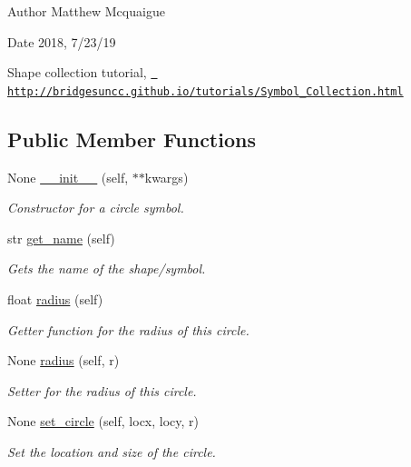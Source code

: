 \begin{DoxyAuthor}{Author}
Matthew Mcquaigue 
\end{DoxyAuthor}
\begin{DoxyDate}{Date}
2018, 7/23/19
\end{DoxyDate}
Shape collection tutorial, \href{http://bridgesuncc.github.io/tutorials/Symbol_Collection.html}{\texttt{ http\+://bridgesuncc.\+github.\+io/tutorials/\+Symbol\+\_\+\+Collection.\+html}} \subsection*{Public Member Functions}
\begin{DoxyCompactItemize}
\item 
None \mbox{\hyperlink{classbridges_1_1circle_1_1_circle_a60369252614097265daa56881e961f9f}{\+\_\+\+\_\+init\+\_\+\+\_\+}} (self, $\ast$$\ast$kwargs)
\begin{DoxyCompactList}\small\item\em Constructor for a circle symbol. \end{DoxyCompactList}\item 
str \mbox{\hyperlink{classbridges_1_1circle_1_1_circle_ac43bc12d5cba70022c99b2e5aa9303f8}{get\+\_\+name}} (self)
\begin{DoxyCompactList}\small\item\em Gets the name of the shape/symbol. \end{DoxyCompactList}\item 
float \mbox{\hyperlink{classbridges_1_1circle_1_1_circle_a6903e60b2342b366d456217756018f4f}{radius}} (self)
\begin{DoxyCompactList}\small\item\em Getter function for the radius of this circle. \end{DoxyCompactList}\item 
None \mbox{\hyperlink{classbridges_1_1circle_1_1_circle_a4048e6ffd463e53ec4eec43695240dc8}{radius}} (self, r)
\begin{DoxyCompactList}\small\item\em Setter for the radius of this circle. \end{DoxyCompactList}\item 
None \mbox{\hyperlink{classbridges_1_1circle_1_1_circle_a7144baba783d925fec886c1a27511be1}{set\+\_\+circle}} (self, locx, locy, r)
\begin{DoxyCompactList}\small\item\em Set the location and size of the circle. \end{DoxyCompactList}\item 
$$
\end{DoxyCompactItemize}
